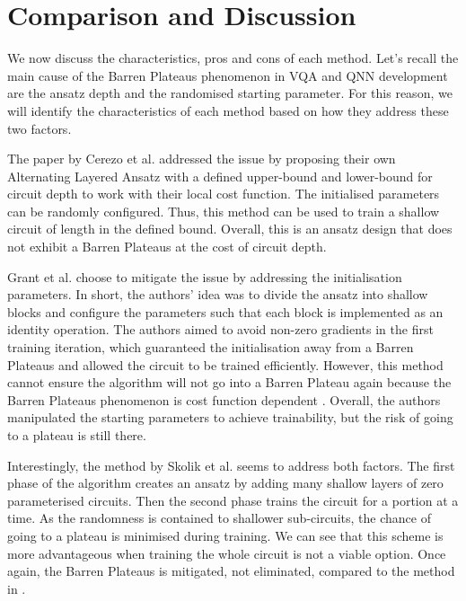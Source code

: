 \section{Comparison and Discussion}
We now discuss the characteristics, pros and cons of each method.
Let's recall the main cause of the Barren Plateaus phenomenon in VQA and QNN development are the ansatz depth and the randomised starting parameter.
For this reason, we will identify the characteristics of each method based on how they address these two factors.

The paper \cite{cerezoCostFunctionDependent2021} by Cerezo et al. addressed the issue by proposing their own Alternating Layered Ansatz with a defined upper-bound and lower-bound for circuit depth to work with their local cost function. 
The initialised parameters can be randomly configured.
Thus, this method can be used to train a shallow circuit of length in the defined bound. 
Overall, this is an ansatz design that does not exhibit a Barren Plateaus at the cost of circuit depth.

Grant et al. \cite{grantInitializationStrategyAddressing2019} choose to mitigate the issue by addressing the initialisation parameters. 
In short, the authors' idea was to divide the ansatz into shallow blocks and configure the parameters such that each block is implemented as an identity operation.
The authors aimed to avoid non-zero gradients in the first training iteration, which guaranteed the initialisation away from a Barren Plateaus and allowed the circuit to be trained efficiently.
However, this method cannot ensure the algorithm will not go into a Barren Plateau again because the Barren Plateaus phenomenon is cost function dependent \cite{cerezoCostFunctionDependent2021}.
Overall, the authors manipulated the starting parameters to achieve trainability, but the risk of going to a plateau is still there.

Interestingly, the method by Skolik et al. \cite{skolikLayerwiseLearningQuantum2021} seems to address both factors.
The first phase of the algorithm creates an ansatz by adding many shallow layers of zero parameterised circuits. 
Then the second phase trains the circuit for a portion at a time.
As the randomness is contained to shallower sub-circuits, the chance of going to a plateau is minimised during training.
We can see that this scheme is more advantageous when training the whole circuit is not a viable option. 
Once again, the Barren Plateaus is mitigated, not eliminated, compared to the method in \cite{cerezoCostFunctionDependent2021}.

